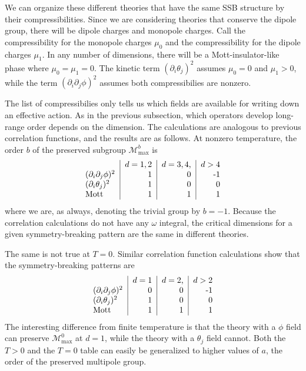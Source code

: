 \documentclass[pra,aps,twocolumn, amsfonts,amsmath,amssymb,nofootinbib,superscriptaddress]{revtex4-2}
\renewcommand{\max}{\text{max}}
\newcommand{\mmax}[1]{\mathcal{M}^{#1}_\max}
\begin{document}
We can organize these different theories that have the same SSB structure by their compressibilities. Since we are considering theories that conserve the dipole group, there will be dipole charges and monopole charges. Call the compressibility for the monopole charges $\mu_0$ and the compressibility for the dipole charges $\mu_1$. In any number of dimensions, there will be a Mott-insulator-like phase where $\mu_0=\mu_1  = 0$. The kinetic term $(\partial_i\theta_j)^2$ assumes $\mu_0=0$ and $\mu_1>0$, while the term $(\partial_i \partial_j \phi)^2$ assumes both compressibilies are nonzero.

The list of compressibilies only tells us which fields are available for writing down an effective action. As in the previous subsection, which operators develop long-range order depends on the dimension. The calculations are analogous to previous correlation functions, and the results are as follows. At nonzero temperature, the order $b$ of the preserved subgroup $\mmax{b}$ is 
\begin{align}
\begin{tabular}{l|r|r|r}
     & $d=1,2$ & $d=3,4$, & $d>4$ \\
    $(\partial_i\partial_j\phi)^2$ &  1 &  0 & -1 \\
    $(\partial_i\theta_j)^2$       &  1 &  0 &  0 \\
    Mott                           &  1 &  1 &  1
\end{tabular}
\end{align}
where we are, as always, denoting the trivial group by $b=-1$. Because the correlation calculations do not have any $\omega$ integral, the critical dimensions for a given symmetry-breaking pattern are the same in different theories. 

The same is not true at $T=0$. Similar correlation function calculations show that the symmetry-breaking patterns are 
\begin{align}
\begin{tabular}{l|r|r|r}
     & $d=1$ & $d=2$, & $d>2$ \\
    $(\partial_i\partial_j\phi)^2$ &  0 &  0 & -1 \\
    $(\partial_i\theta_j)^2$       &  1 &  0 &  0 \\
    Mott                           &  1 &  1 &  1
\end{tabular} \label{eqn:zerophases}
\end{align}
The interesting difference from finite temperature is that the theory with a $\phi$ field can preserve $\mmax{0}$ at $d=1$, while the theory with a $\theta_j$ field cannot.
Both the $T>0$ and the $T=0$ table can easily be generalized to higher values of $a$, the order of the preserved multipole group.
\end{document}
